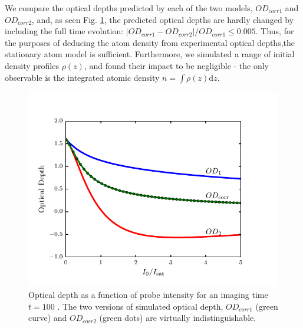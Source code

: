 \documentclass[12pt]{iopart}
\begin{document}
\par We compare the optical depths predicted by each of the two models, $OD_{corr1}$ and $OD_{corr2}$, and, as seen Fig. \ref{fig:atomTravel}, the predicted optical depths are hardly changed by including the full time evolution:  $\left|OD_{corr1}-OD_{corr2}\right|/OD_{corr1} \le 0.005$. Thus, for the purposes of deducing the atom density from experimental optical depths,the stationary atom model is sufficient. Furthermore, we simulated a range of initial density profiles $\rho(z)$, and found their impact to be negligible - the only observable is the integrated atomic density $n=\int\rho(z)\mathrm{d}z$. 
\begin{figure}
	\includegraphics{figure7.pdf}
\caption{Optical depth as a function of probe intensity for an imaging time $t=100$ \us. The two versions of simulated optical depth, $OD_{corr1}$ (green curve) and $OD_{corr2}$ (green dots) are virtually indistinguishable. }  
\label{fig:atomTravel}
\end{figure}
\end{document}
